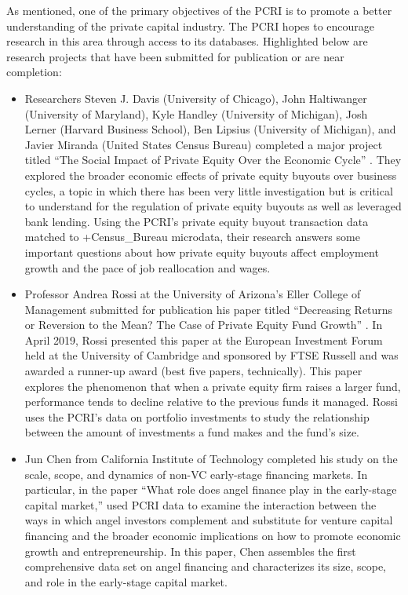 \documentclass[
]{book}
\begin{document}
As mentioned, one of the primary objectives of the PCRI is to promote a better understanding of the private capital industry. The PCRI hopes to encourage research in this area through access to its databases. Highlighted below are research projects that have been submitted for publication or are near completion:

\begin{itemize}
\item
  Researchers Steven J. Davis (University of Chicago), John Haltiwanger (University of Maryland), Kyle Handley (University of Michigan), Josh Lerner (Harvard Business School), Ben Lipsius (University of Michigan), and Javier Miranda (United States Census Bureau) completed a major project titled ``The Social Impact of Private Equity Over the Economic Cycle'' \citep{davis2019}. They explored the broader economic effects of private equity buyouts over business cycles, a topic in which there has been very little investigation but is critical to understand for the regulation of private equity buyouts as well as leveraged bank lending. Using the PCRI's private equity buyout transaction data matched to +Census\_Bureau\textbar{} microdata, their research answers some important questions about how private equity buyouts affect employment growth and the pace of job reallocation and wages.
\item
  Professor Andrea Rossi at the University of Arizona's Eller College of Management submitted for publication his paper titled ``Decreasing Returns or Reversion to the Mean? The Case of Private Equity Fund Growth'' \citeyearpar{rossi2019}. In April 2019, Rossi presented this paper at the European Investment Forum held at the University of Cambridge and sponsored by FTSE Russell and was awarded a runner-up award (best five papers, technically). This paper explores the phenomenon that when a private equity firm raises a larger fund, performance tends to decline relative to the previous funds it managed. Rossi uses the PCRI's data on portfolio investments to study the relationship between the amount of investments a fund makes and the fund's size.
\item
  Jun Chen from California Institute of Technology completed his study on the scale, scope, and dynamics of non-VC early-stage financing markets. In particular, in the paper ``What role does angel finance play in the early-stage capital market,'' \citeyearpar{chen2017} used PCRI data to examine the interaction between the ways in which angel investors complement and substitute for venture capital financing and the broader economic implications on how to promote economic growth and entrepreneurship. In this paper, Chen assembles the first comprehensive data set on angel financing and characterizes its size, scope, and role in the early-stage capital market.

\end{itemize}
\end{document}
